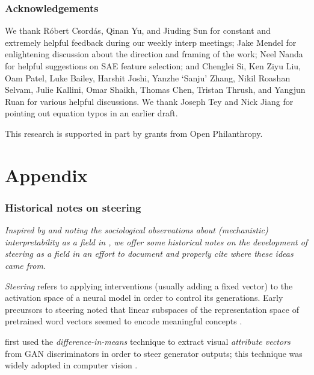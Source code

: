 \documentclass{article}
\theoremstyle{plain}
\theoremstyle{definition}
\theoremstyle{remark}
\renewcommand{\cite}{\citep}
\begin{document}
\section*{Acknowledgements}
We thank Róbert Csordás, Qinan Yu, and Jiuding Sun for constant and extremely helpful feedback during our weekly interp meetings; Jake Mendel for enlightening discussion about the direction and framing of the work; Neel Nanda for helpful suggestions on SAE feature selection; 
and Chenglei Si, Ken Ziyu Liu, Oam Patel, Luke Bailey, Harshit Joshi, Yanzhe `Sanju' Zhang, Nikil Roashan Selvam, Julie Kallini, Omar Shaikh, Thomas Chen, Tristan Thrush, and Yangjun Ruan for various helpful discussions. We thank Joseph Tey and Nick Jiang for pointing out equation typos in an earlier draft.

This research is supported in part by grants from
Open Philanthropy.





\newpage
\appendix
\onecolumn
\renewcommand \thepart{}
\renewcommand \partname{}
\noptcrule
\part{Appendix} %
\parttoc %

\section{Historical notes on steering}

\textit{Inspired by \citet{slp3} and noting the sociological observations about (mechanistic) interpretability as a field in \citet{saphra-wiegreffe-2024-mechanistic}, we offer some historical notes on the development of steering as a field in an effort to document and properly cite where these ideas came from.}

\textit{Steering} refers to applying interventions (usually adding a fixed vector) to the activation space of a neural model in order to control its generations. Early precursors to steering noted that linear subspaces of the representation space of pretrained word vectors seemed to encode meaningful concepts \cite{mikolov2013,pennington-etal-2014-glove,bolukbasi2016man}.

\citet{larsen2016auto} first used the \textit{difference-in-means} technique to extract visual \textit{attribute vectors} from GAN discriminators in order to steer generator outputs; this technique was widely adopted in computer vision \cite{white2016samplinggenerativenetworks,upchurch2017,goh,wang2019implicit}.
\end{document}
